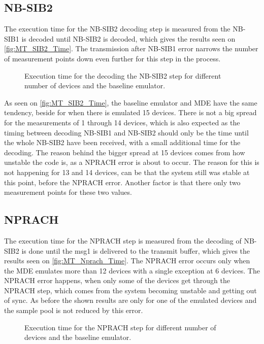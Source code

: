 \subsection{NB-SIB2}
The execution time for the NB-SIB2 decoding step is measured from the NB-SIB1 is decoded until NB-SIB2 is decoded, which gives the results seen on \autoref{fig:MT_SIB2_Time}. The transmission after NB-SIB1 error narrows the number of measurement points down even further for this step in the process.

\begin{figure}[H]
\centering

\caption{Execution time for the decoding the NB-SIB2 step for different number of devices and the baseline emulator.}
\label{fig:MT_SIB2_Time}
\end{figure}


As seen on \autoref{fig:MT_SIB2_Time}, the baseline emulator and MDE have the same tendency, beside for when there is emulated 15 devices. There is not a big spread for the measurements of 1 through 14 devices, which is also expected as the timing between decoding NB-SIB1 and NB-SIB2 should only be the time until the whole NB-SIB2 have been received, with a small additional time for the decoding. The reason behind the bigger spread at 15 devices comes from how unstable the code is, as a NPRACH error is about to occur. The reason for this is not happening for 13 and 14 devices, can be that the system still was stable at this point, before the NPRACH error. Another factor is that there only two measurement points for these two values.


\subsection{NPRACH}
The execution time for the NPRACH step is measured from the decoding of NB-SIB2 is done until the msg1 is delivered to the transmit buffer, which gives the results seen on \autoref{fig:MT_Nprach_Time}. The NPRACH error occurs only when the MDE emulates more than 12 devices with a single exception at 6 devices. The NPRACH error happens, when only some of the devices get through the NPRACH step, which comes from the system becoming unstable and getting out of sync. As before the shown results are only for one of the emulated devices and the sample pool is not reduced by this error.

\begin{figure}[H]
\centering
\resizebox{0.5\textwidth}{!}{
}
\caption{Execution time for the NPRACH step for different number of devices and the baseline emulator.}
\label{fig:MT_Nprach_Time}
\end{figure}

